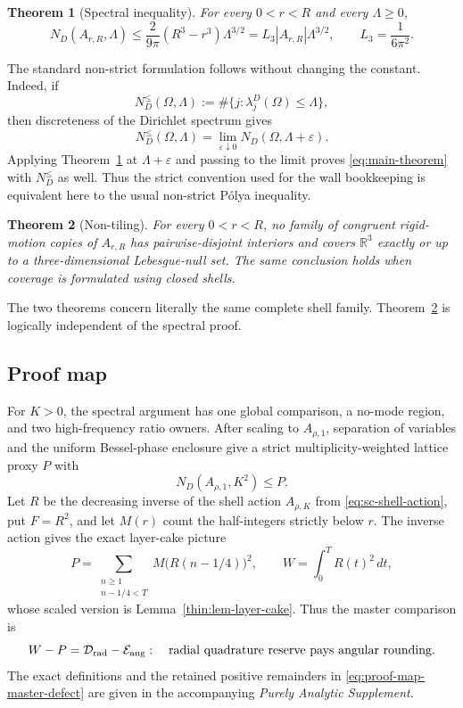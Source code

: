 \documentclass[11pt]{article}
\numberwithin{equation}{section}
\newtheorem{theorem}{Theorem}[section]
\theoremstyle{definition}
\theoremstyle{remark}
\newcommand{\R}{\mathbb R}
\begin{document}
\begin{theorem}[Spectral inequality]
\label{thm:spectral}
For every \(0<r<R\) and every \(\Lambda\ge0\),
\begin{equation}
  \boxed{
  N_D(A_{r,R},\Lambda)
  \le \frac{2}{9\pi}(R^3-r^3)\Lambda^{3/2}
  =L_3|A_{r,R}|\Lambda^{3/2},
  \qquad L_3=\frac1{6\pi^2}.}
  \label{eq:main-theorem}
\end{equation}
\end{theorem}

The standard non-strict formulation follows without changing the constant.
Indeed, if
\[
 N_D^{\leq}(\Omega,\Lambda)
 :=\#\{j:\lambda_j^D(\Omega)\leq\Lambda\},
\]
then discreteness of the Dirichlet spectrum gives
\begin{equation}
 N_D^{\leq}(\Omega,\Lambda)
 =\lim_{\varepsilon\downarrow0}
 N_D(\Omega,\Lambda+\varepsilon).
 \label{eq:strict-to-nonstrict}
\end{equation}
Applying Theorem~\ref{thm:spectral} at
\(\Lambda+\varepsilon\) and passing to the limit proves
\eqref{eq:main-theorem} with \(N_D^{\leq}\) as well.  Thus the strict
convention used for the wall bookkeeping is equivalent here to the usual
non-strict P\'olya inequality.

\begin{theorem}[Non-tiling]
\label{thm:nontiling}
For every \(0<r<R\), no family of congruent rigid-motion copies of
\(A_{r,R}\) has pairwise-disjoint interiors and covers \(\R^3\) exactly or
up to a three-dimensional Lebesgue-null set.  The same conclusion holds when
coverage is formulated using closed shells.
\end{theorem}

The two theorems concern literally the same complete shell family.
Theorem~\ref{thm:nontiling} is logically independent of the spectral proof.

\subsection*{Proof map}

For \(K>0\), the spectral argument has one global comparison, a no-mode
region, and two high-frequency ratio owners.  After scaling to
\(A_{\rho,1}\), separation of variables and the uniform Bessel-phase
enclosure give a strict multiplicity-weighted lattice proxy \(P\) with
\[
 N_D(A_{\rho,1},K^2)\leq P.
\]
Let \(R\) be the decreasing inverse of the shell action
\(A_{\rho,K}\) from \eqref{eq:sc-shell-action}, put \(F=R^2\), and let
\(M(r)\) count the half-integers strictly below \(r\).  The inverse action
gives the exact layer-cake picture
\[
 P=\sum_{\substack{n\geq1\\n-1/4<T}}M\bigl(R(n-1/4)\bigr)^2,
 \qquad
 W=\int_0^T R(t)^2\,dt,
\]
whose scaled version is Lemma~\ref{thin:lem-layer-cake}.  Thus the master
comparison is
\begin{equation}
 W-P=\mathcal D_{\rm rad}-\mathcal E_{\rm ang}:
 \quad\hbox{radial quadrature reserve pays angular rounding.}
 \label{eq:proof-map-master-defect}
\end{equation}
The exact definitions and the retained positive remainders in
\eqref{eq:proof-map-master-defect} are given in the accompanying
\emph{Purely Analytic Supplement}.
\end{document}
